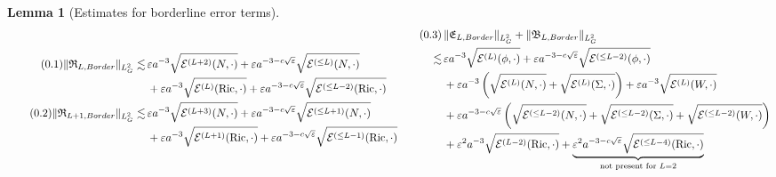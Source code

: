 \documentclass[11pt,leqno,textwidth=10cm]{amsart}
\numberwithin{equation}{section}
\theoremstyle{definition}
\theoremstyle{plain}
\newtheorem{lemma}[definition]{Lemma}
\newcommand{\1}{\mathbbm{1}}
\newcommand{\E}{\mathcal{E}}
\newcommand{\Ric}{\text{\normalfont{Ric}}}
\renewcommand{\epsilon}{\varepsilon}
\newcommand{\Lap}{\Delta}
\newcommand{\numberthis}{\addtocounter{equation}{1}\tag{\theequation}}
\renewcommand{\theequation}{\arabic{section}.\arabic{equation}}
\newcommand{\delete}[1]{}
\begin{document}
\begin{lemma}[Estimates for borderline error terms]
\begin{subequations}
\begin{align*}
\numberthis\label{eq:L2-Border-R-even}\|\mathfrak{R}_{L,Border}\|_{L^2_G}\lesssim&\,\epsilon a^{-3}\sqrt{\E^{(L+2)}(N,\cdot)}+\epsilon a^{-3-c\sqrt{\epsilon}}\sqrt{\E^{(\leq L)}(N,\cdot)}\\
&\,+\epsilon a^{-3}\sqrt{\E^{(L)}(\Ric,\cdot)}+\epsilon a^{-3-c\sqrt{\epsilon}}\sqrt{\E^{(\leq L-2)}(\Ric,\cdot)}\\
\numberthis\label{eq:L2-Border-R-odd}\|\mathfrak{R}_{L+1,Border}\|_{L^2_G}\lesssim&\,\epsilon a^{-3}\sqrt{\E^{(L+3)}(N,\cdot)}+\epsilon a^{-3-c\sqrt{\epsilon}}\sqrt{\E^{(\leq L+1)}(N,\cdot)}\\
&\,+\epsilon a^{-3}\sqrt{\E^{(L+1)}(\Ric,\cdot)}+\epsilon a^{-3-c\sqrt{\epsilon}}\sqrt{\E^{(\leq L-1)}(\Ric,\cdot)}
\end{align*}
\vspace{-1em}
\begin{align*}
\numberthis\label{eq:L2-Border-BR}&\,\|\mathfrak{E}_{L,Border}\|_{L^2_G}+\|\mathfrak{B}_{L,Border}\|_{L^2_G}\\
\lesssim&\,\epsilon a^{-3}\sqrt{\E^{(L)}(\phi,\cdot)}+\epsilon a^{-3-c\sqrt{\epsilon}}\sqrt{\E^{(\leq L-2)}(\phi,\cdot)}\\
&\,+\epsilon a^{-3}\left(\sqrt{\E^{(L)}(N,\cdot)}+\sqrt{\E^{(L)}(\Sigma,\cdot)}\right)+\epsilon a^{-3}\sqrt{\E^{(L)}(W,\cdot)}\\
&\,+\epsilon a^{-3-c\sqrt{\epsilon}}\left(\sqrt{\E^{(\leq L-2)}(N,\cdot)}+\sqrt{\E^{(\leq L-2)}(\Sigma,\cdot)}+\sqrt{\E^{(\leq L-2)}(W,\cdot)}\right)\\
&\,+\epsilon^2a^{-3}\sqrt{\E^{(L-2)}(\Ric,\cdot)}+\underbrace{\epsilon^2a^{-3-c\sqrt{\epsilon}}\sqrt{\E^{(\leq L-4)}(\Ric,\cdot)}}_{\text{not present for }L=2}
\end{align*}
\delete{Further, we have the alternative estimates [...]}

\end{subequations}
\end{lemma}
\end{document}
